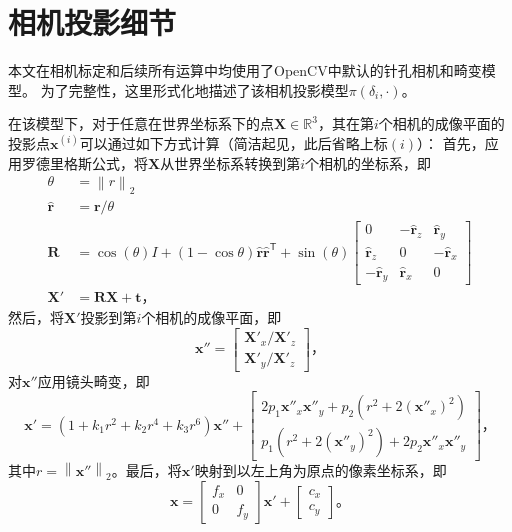 \appendix

\chapter{相机投影细节}
\label{app:camera_model}

本文在相机标定和后续所有运算中均使用了OpenCV中默认的针孔相机和畸变模型。
为了完整性，这里形式化地描述了该相机投影模型$\pi(\delta_i, \cdot)$。

在该模型下，对于任意在世界坐标系下的点$\mathbf{X}\in \mathbb{R}^3$，其在第$i$个相机的成像平面的投影点$\mathbf{x}^{(i)}$可以通过如下方式计算（简洁起见，此后省略上标$(i)$）：
首先，应用罗德里格斯公式\cite{rodrigues}，将$\mathbf{X}$从世界坐标系转换到第$i$个相机的坐标系，即
\begin{align}
    \theta &= \left\|r\right\|_2 \\
    \hat{\mathbf{r}} &= \mathbf{r}/ \theta \\
    \mathbf{R} &= \cos(\theta) I + (1- \cos{\theta} ) \hat{\mathbf{r}} \hat{\mathbf{r}}^\mathsf{T} + \sin(\theta) \begin{bmatrix}
         0   & -\hat{\mathbf{r}}_z & \hat{\mathbf{r}}_y \\
         \hat{\mathbf{r}}_z & 0    & -\hat{\mathbf{r}}_x \\
        -\hat{\mathbf{r}}_y &  \hat{\mathbf{r}}_x & 0
    \end{bmatrix}\label{eq:rodrigues} \\
    \mathbf{X}' &= \mathbf{R} \mathbf{X} + \mathbf{t}\text{，}
\end{align}
然后，将$\mathbf{X}'$投影到第$i$个相机的成像平面，即
\begin{equation}
    \mathbf{x}'' = \begin{bmatrix}
        \mathbf{X}'_x / \mathbf{X}'_z \\
        \mathbf{X}'_y / \mathbf{X}'_z
    \end{bmatrix}\text{，}
\end{equation}
对$\mathbf{x}''$应用镜头畸变，即
\begin{equation}
    \mathbf{x}' = \left(1 + k_1 r^2 + k_2 r^4 + k_3 r^6\right) \mathbf{x}'' + \begin{bmatrix}
        2 p_1 \mathbf{x}''_x \mathbf{x}''_y + p_2 \left(r^2 + 2 (\mathbf{x}''_x)^2\right) \\
        p_1 \left(r^2 + 2 (\mathbf{x}''_y)^2\right) + 2 p_2 \mathbf{x}''_x \mathbf{x}''_y
    \end{bmatrix}\text{，}
\end{equation}
其中$r = \left\|\mathbf{x}''\right\|_2$。最后，将$\mathbf{x}'$映射到以左上角为原点的像素坐标系，即
\begin{equation}
    \mathbf{x} = \begin{bmatrix}f_x & 0 \\ 0 & f_y \end{bmatrix} \mathbf{x}' + \begin{bmatrix}c_x \\ c_y \end{bmatrix}\text{。}
\end{equation}

